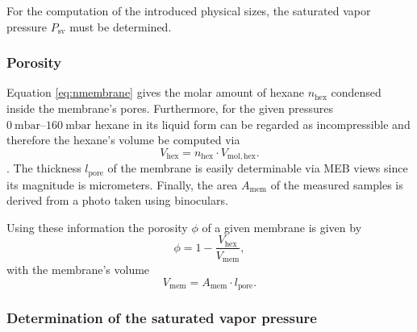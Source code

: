 \documentclass[../thesis.tex]{subfiles}
\begin{document}
          For the computation of the introduced physical sizes, the saturated vapor pressure $P_\mathrm{sv}$ must be determined.


          \subsubsection{Porosity}
          \label{sssec:porosity}

            Equation \cref{eq:nmembrane} gives the molar amount of hexane $n_\mathrm{hex}$ condensed inside the membrane's pores. Furthermore, for the given pressures $\SIrange{0}{160}{\milli\bar}$ hexane in its liquid form can be regarded as incompressible and therefore the hexane's volume be computed via
            \begin{equation*}
                V_\mathrm{hex} = n_\mathrm{hex} \cdot V_\mathrm{mol, hex}.
            \end{equation*}.
            The thickness $l_\mathrm{pore}$ of the membrane is easily determinable via MEB views since its magnitude is micrometers. Finally, the area $A_\mathrm{mem}$ of the measured samples is derived from a photo taken using binoculars.

            Using these information the porosity $\phi$ of a given membrane is given by
            \begin{equation}
                \phi = 1 - \frac{V_\mathrm{hex}}{V_\mathrm{mem}} ,
                \label{eq:porosity}
            \end{equation}
            with the membrane's volume
            \begin{equation*}
                V_\mathrm{mem} = A_\mathrm{mem} \cdot l_\mathrm{pore}.
            \end{equation*}


          \subsubsection{Determination of the saturated vapor pressure}
          \label{sssec:determination-sat-vapor-pressure}
\end{document}

